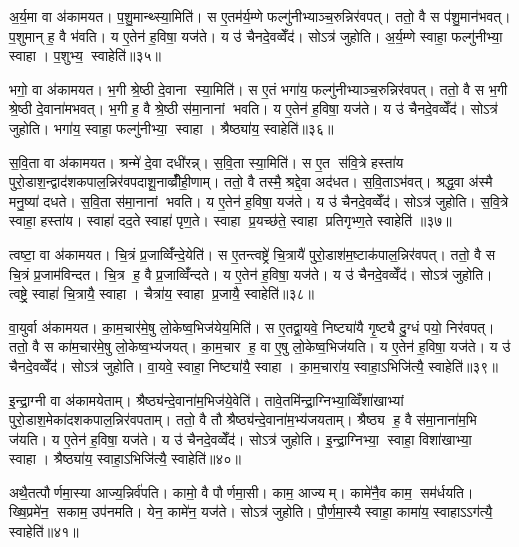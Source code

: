 अ॒र्य॒मा वा अ॑कामयत। प॒शु॒मान्थ्स्या॒मिति॑। स ए॒तम॑र्य॒म्णे फल्गु॑नीभ्याञ्च॒रुन्निर॑वपत्। ततो॒ वै स प॑शु॒मान॑भवत्। प॒शुमान् ह॒ वै भ॑वति। य ए॒तेन॑ ह॒विषा॒ यज॑ते। य उ॑ चैनदे॒वव्वेँद॑। सोऽत्र॑ जुहोति। अ॒र्य॒म्णे स्वाहा॒ फल्गु॑नीभ्या॒ स्वाहा। प॒शुभ्य॒ स्वाहेति॑॥३५॥

भगो॒ वा अ॑कामयत। भ॒गी श्रे॒ष्ठी दे॒वाना स्या॒मिति॑। स ए॒तं भगा॑य॒ फल्गु॑नीभ्याञ्च॒रुन्निर॑वपत्। ततो॒ वै स भ॒गी श्रे॒ष्ठी दे॒वाना॑मभवत्। भ॒गी ह॒ वै श्रे॒ष्ठी स॑मा॒नानां भवति। य ए॒तेन॑ ह॒विषा॒ यज॑ते। य उ॑ चैनदे॒वव्वेँद॑। सोऽत्र॑ जुहोति। भगा॑य॒ स्वाहा॒ फल्गु॑नीभ्या॒ स्वाहा। श्रैष्ठ्या॑य॒ स्वाहेति॑॥३६॥

स॒वि॒ता वा अ॑कामयत। श्रन्मे॑ दे॒वा दधी॑रन्न्। स॒वि॒ता स्या॒मिति॑। स ए॒त स॑वि॒त्रे हस्ता॑य पुरो॒डाश॒न्द्वाद॑शकपाल॒न्निर॑वपदाशू॒नाव्व्रीँ॑ही॒णाम्। ततो॒ वै तस्मै॒ श्रद्दे॒वा अद॑धत। स॒वि॒ताऽभ॑वत्। श्रद्ध॒वा अ॑स्मै मनु॒ष्या॑ दधते। स॒वि॒ता स॑मा॒नानां भवति। य ए॒तेन॑ ह॒विषा॒ यज॑ते। य उ॑ चैनदे॒वव्वेँद॑। सोऽत्र॑ जुहोति। स॒वि॒त्रे स्वाहा॒ हस्ता॑य। स्वाहा॑ दद॒ते स्वाहा॑ पृण॒ते। स्वाहा प्र॒यच्छ॑ते॒ स्वाहा प्रतिगृभ्ण॒ते स्वाहेति॑ ॥३७॥

त्वष्टा॒ वा अ॑कामयत। चि॒त्रं प्र॒जाव्विँ॑न्दे॒येति॑। स ए॒तन्त्वष्ट्रे॑ चि॒त्रायै॑ पुरो॒डाश॑म॒ष्टाक॑पाल॒न्निर॑वपत्। ततो॒ वै स चि॒त्रं प्र॒जाम॑विन्दत। चि॒त्र ह॒ वै प्र॒जाव्विँ॑न्दते। य ए॒तेन॑ ह॒विषा॒ यज॑ते। य उ॑ चैनदे॒वव्वेँद॑। सोऽत्र॑ जुहोति। त्वष्ट्रे॒ स्वाहा॑ चि॒त्रायै॒ स्वाहा। चैत्रा॑य॒ स्वाहा प्र॒जायै॒ स्वाहेति॑॥३८॥

वा॒युर्वा अ॑कामयत। का॒म॒चार॑मे॒षु लो॒केष्व॒भिज॑येय॒मिति॑। स ए॒तद्वा॒यवे॒ निष्ट्या॑यै गृ॒ष्ट्यै दु॒ग्धं पयो॒ निर॑वपत्। ततो॒ वै स का॑म॒चार॑मे॒षु लो॒केष्व॒भ्य॑जयत्। का॒म॒चार ह॒ वा ए॒षु लो॒केष्व॒भिज॑यति। य ए॒तेन॑ ह॒विषा॒ यज॑ते। य उ॑ चैनदे॒वव्वेँद॑। सोऽत्र॑ जुहोति। वा॒यवे॒ स्वाहा॒ निष्ट्या॑यै॒ स्वाहा। का॒म॒चारा॑य॒ स्वाहा॒ऽभिजि॑त्यै॒ स्वाहेति॑॥३९॥

इ॒न्द्रा॒ग्नी वा अ॑कामयेताम्। श्रैष्ठ्य॑न्दे॒वाना॑म॒भिज॑ये॒वेति॑। तावे॒तमि॑न्द्रा॒ग्निभ्या॒व्विँशा॑खाभ्यां पुरो॒डाश॒मेका॑दशकपाल॒न्निर॑वपताम्। ततो॒ वै तौ श्रैष्ठ्य॑न्दे॒वाना॑म॒भ्य॑जयताम्। श्रैष्ठ्य ह॒ वै स॑मा॒नाना॑म॒भि ज॑यति। य ए॒तेन॑ ह॒विषा॒ यज॑ते। य उ॑ चैनदे॒वव्वेँद॑। सोऽत्र॑ जुहोति। इ॒न्द्रा॒ग्निभ्या॒ स्वाहा॒ विशा॑खाभ्या॒ स्वाहा। श्रैष्ठ्या॑य॒ स्वाहा॒ऽभिजि॑त्यै॒ स्वाहेति॑॥४०॥

अथै॒तत्पौर्णमा॒स्या आज्य॒न्निर्व॑पति। कामो॒ वै पौर्णमा॒सी। काम॒ आज्यम्। कामे॑नै॒व काम॒ सम॑र्धयति। ख्षि॒प्रमे॑न॒ सकाम॒ उप॑नमति। येन॒ कामे॑न॒ यज॑ते। सोऽत्र॑ जुहोति। पौ॒र्ण॒मा॒स्यै स्वाहा॒ कामा॑य॒ स्वाहाऽऽग॑त्यै॒ स्वाहेति॑॥४१॥\anuvakamend[अ॒ग्निः पञ्च॑दश प्र॒जाप॑ति॒ष्षोड॑श॒ सोम॒ एका॑दश रु॒द्रो दश॒र्ख्षैका॑दश॒ बृह॒स्पति॒र्दश॑ देवासु॒रा नव॑ पि॒तर॒ एका॑दशार्य॒मा भगो॒ दश॑ दश सवि॒ता चतु॑र्दश॒ त्वष्टा॑ वा॒युरि॑न्द्रा॒ग्नी दश॑ द॒शाथै॒तत्पौर्णमा॒स्या अ॒ष्टौ पञ्च॑दश]

